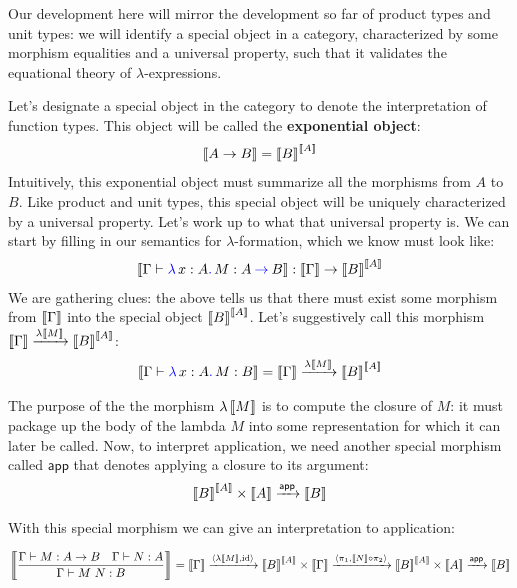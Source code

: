 Our development here will mirror the development so far of product types and
unit types: we will identify a special object in a category, characterized by
some morphism equalities and a universal property, such that it validates the
equational theory of $\lambda$-expressions.

Let's designate a special object in the category
to denote the interpretation of function types. This object
will be called the \textbf{exponential object}:
\begin{align}
  \left\llbracket A \to B \right\rrbracket = \left\llbracket B \right\rrbracket^{\left\llbracket A \right\rrbracket}
\end{align}
Intuitively, this exponential object must summarize all the morphisms from $A$
to $B$.
Like product and unit types, this special object will be uniquely characterized
by a universal property. Let's work up to what that universal property is.
We can start by filling in our semantics for $\lambda$-formation,
which we know must look like:
\begin{align}
  \left\llbracket \Gamma \vdash {\color{blue}\lambda}\,x : A{\color{blue}.}\,M : {A \mathbin{{\color{blue}\to}} B} \right\rrbracket : \left\llbracket \Gamma \right\rrbracket \to \left\llbracket B \right\rrbracket^{\left\llbracket A \right\rrbracket}
\end{align}
We are gathering clues: the above tells us that there must exist some
morphism from $\left\llbracket \Gamma \right\rrbracket$ into the special object $\left\llbracket B \right\rrbracket^{\left\llbracket A \right\rrbracket}$.
Let's suggestively call this morphism $\left\llbracket \Gamma \right\rrbracket \xrightarrow{\lambda \left\llbracket M \right\rrbracket} \left\llbracket B \right\rrbracket^{\left\llbracket A \right\rrbracket}$:
\begin{align}
  \left\llbracket \Gamma \vdash {\color{blue}\lambda}\,x : A{\color{blue}.}\,M : B \right\rrbracket = \left\llbracket \Gamma \right\rrbracket \xrightarrow{\lambda \left\llbracket M \right\rrbracket}
  \left\llbracket B \right\rrbracket^{\left\llbracket A \right\rrbracket}
\end{align}

\newcommand\app{\mathsf{app}}
\newcommand\lam{\lambda}

The purpose of the the morphism $\lambda \left\llbracket M \right\rrbracket$ is to compute the closure
of $M$: it must package up the body of the lambda $M$ into some representation
for which it can later be called. Now, to interpret application,
we need another special morphism called $\app{}$ that denotes applying a closure
to its argument:
\begin{align}
  \dbracket{B}^{\dbracket{A}} \times \dbracket{A} \mor{\app{}} \dbracket{B}
\end{align}

With this special morphism we can give an interpretation to application:
\begin{fullwidth}
\begin{align}
  \dbracket{\dfrac{\Gamma \vdash M : A \to B \quad \Gamma \vdash N : A}{\Gamma \vdash M~N : B}}
  = \dbracket{\Gamma} \mor{\langle \lambda \dbracket{M}, \id \rangle} \dbracket{B}^{\dbracket{A}} \times \dbracket{\Gamma}
  \mor{\langle \pi_1, \dbracket{N} \circ\pi_2\rangle } \dbracket{B}^{\dbracket{A}} \times \dbracket{A}
  \mor{\app{}} \dbracket{B}
\end{align}
\end{fullwidth}

